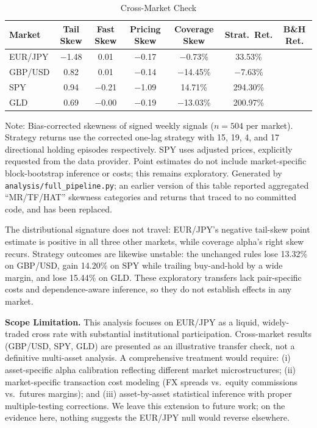\documentclass[11pt]{article}
\begin{document}
\begin{table}[H]
\centering
\caption{Cross-Market Check}
\label{tab:crossmarket}
\small
\begin{tabular}{@{}lcccccc@{}}
\toprule
Market & Tail Skew & Fast Skew & Pricing Skew & Coverage Skew & Strat.\ Ret. & B\&H Ret. \\
\midrule
EUR/JPY & $-$1.48 & 0.01 & $-$0.17 & $-$0.73\% & 33.53\% \\
GBP/USD & 0.82 & 0.01 & $-$0.14 & $-$14.45\% & $-$7.63\% \\
SPY & 0.94 & $-$0.21 & $-$1.09 & 14.71\% & 294.30\% \\
GLD & 0.69 & $-$0.00 & $-$0.19 & $-$13.03\% & 200.97\% \\
\bottomrule
\end{tabular}
\par\vspace{0.3em}
\parbox{\linewidth}{\footnotesize Note: Bias-corrected skewness of signed weekly signals ($n = 504$ per market). Strategy returns use the corrected one-lag strategy with 15, 19, 4, and 17 directional holding episodes respectively. SPY uses adjusted prices, explicitly requested from the data provider. Point estimates do not include market-specific block-bootstrap inference or costs; this remains exploratory. Generated by \texttt{analysis/full\_pipeline.py}; an earlier version of this table reported aggregated ``MR/TF/HAT'' skewness categories and returns that traced to no committed code, and has been replaced.}
\end{table}

The distributional signature does not travel: EUR/JPY's negative tail-skew point estimate is positive in all three other markets, while coverage alpha's right skew recurs. Strategy outcomes are likewise unstable: the unchanged rules lose 13.32\% on GBP/USD, gain 14.20\% on SPY while trailing buy-and-hold by a wide margin, and lose 15.44\% on GLD. These exploratory transfers lack pair-specific costs and dependence-aware inference, so they do not establish effects in any market.

\textbf{Scope Limitation.} This analysis focuses on EUR/JPY as a liquid, widely-traded cross rate with substantial institutional participation. Cross-market results (GBP/USD, SPY, GLD) are presented as an illustrative transfer check, not a definitive multi-asset analysis. A comprehensive treatment would require: (i) asset-specific alpha calibration reflecting different market microstructures; (ii) market-specific transaction cost modeling (FX spreads vs.\ equity commissions vs.\ futures margins); and (iii) asset-by-asset statistical inference with proper multiple-testing corrections. We leave this extension to future work; on the evidence here, nothing suggests the EUR/JPY null would reverse elsewhere.
\end{document}
